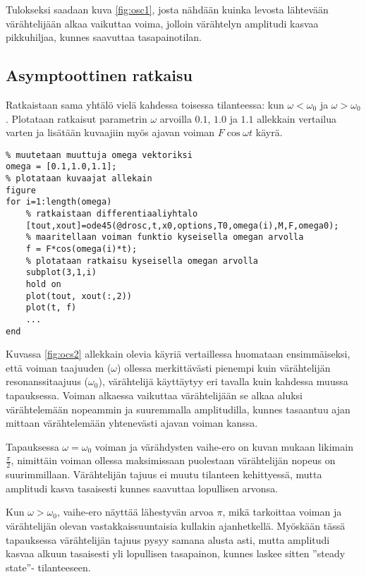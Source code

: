 \documentclass[a4paper,11pt]{article}
\begin{document}
Tulokseksi saadaan kuva \ref{fig:osc1}, josta nähdään kuinka levosta lähtevään värähtelijään alkaa vaikuttaa voima, jolloin värähtelyn amplitudi kasvaa pikkuhiljaa, kunnes saavuttaa tasapainotilan.

\subsection{Asymptoottinen ratkaisu}
\label{asymp}

Ratkaistaan sama yhtälö vielä kahdessa toisessa tilanteessa: kun $\omega < \omega_0$ ja $\omega > \omega_0$. Plotataan ratkaisut parametrin $\omega$ arvoilla $0.1$, $1.0$ ja $1.1$ allekkain vertailua varten ja lisätään kuvaajiin myös ajavan voiman $F\cos{\omega t}$ käyrä.

\begin{lstlisting}
% muutetaan muuttuja omega vektoriksi
omega = [0.1,1.0,1.1];
% plotataan kuvaajat allekain
figure
for i=1:length(omega)
    % ratkaistaan differentiaaliyhtalo
    [tout,xout]=ode45(@drosc,t,x0,options,T0,omega(i),M,F,omega0);
    % maaritellaan voiman funktio kyseisella omegan arvolla
    f = F*cos(omega(i)*t);
    % plotataan ratkaisu kyseisella omegan arvolla
    subplot(3,1,i)
    hold on
    plot(tout, xout(:,2))
    plot(t, f) 
    ...
end
\end{lstlisting}

Kuvassa \ref{fig:ocs2} allekkain olevia käyriä vertaillessa huomataan ensimmäiseksi, että voiman taajuuden ($\omega$) ollessa merkittävästi pienempi kuin värähtelijän resonanssitaajuus ($\omega_0$), värähtelijä käyttäytyy eri tavalla kuin kahdessa muussa tapauksessa. Voiman alkaessa vaikuttaa värähtelijään se alkaa aluksi värähtelemään nopeammin ja suuremmalla amplitudilla, kunnes tasaantuu ajan mittaan värähtelemään yhtenevästi ajavan voiman kanssa.

Tapauksessa $\omega = \omega_0$ voiman ja värähdysten vaihe-ero on kuvan mukaan likimain $\frac{\pi}{2}$, nimittäin voiman ollessa maksimissaan puolestaan värähtelijän nopeus on suurimmillaan. Värähtelijän tajuus ei muutu tilanteen kehittyessä, mutta amplitudi kasva tasaisesti kunnes saavuttaa lopullisen arvonsa.

Kun $\omega > \omega_0$, vaihe-ero näyttää lähestyvän arvoa $\pi$, mikä tarkoittaa voiman ja värähtelijän olevan vastakkaissuuntaisia kullakin ajanhetkellä. Myöskään tässä tapauksessa värähtelijän tajuus pysyy samana alusta asti, mutta amplitudi kasvaa alkuun tasaisesti yli lopullisen tasapainon, kunnes laskee sitten ''steady state''- tilanteeseen.
\end{document}
